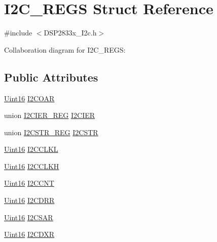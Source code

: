 \hypertarget{struct_i2_c___r_e_g_s}{}\section{I2\+C\+\_\+\+R\+E\+G\+S Struct Reference}
\label{struct_i2_c___r_e_g_s}


{\ttfamily \#include $<$D\+S\+P2833x\+\_\+\+I2c.\+h$>$}



Collaboration diagram for I2\+C\+\_\+\+R\+E\+G\+S\+:
\subsection*{Public Attributes}
\begin{DoxyCompactItemize}
\item 
\hyperlink{_d_s_p2833x___device_8h_a59a9f6be4562c327cbfb4f7e8e18f08b}{Uint16} \hyperlink{struct_i2_c___r_e_g_s_a0c60cb849264d3d8c932511715d55f1d}{I2\+C\+O\+A\+R}
\item 
union \hyperlink{union_i2_c_i_e_r___r_e_g}{I2\+C\+I\+E\+R\+\_\+\+R\+E\+G} \hyperlink{struct_i2_c___r_e_g_s_a476dc6105298595529fe2ac2ce94ba60}{I2\+C\+I\+E\+R}
\item 
union \hyperlink{union_i2_c_s_t_r___r_e_g}{I2\+C\+S\+T\+R\+\_\+\+R\+E\+G} \hyperlink{struct_i2_c___r_e_g_s_a478b82d4d7d8b07ffa5b82cae7f60c1a}{I2\+C\+S\+T\+R}
\item 
\hyperlink{_d_s_p2833x___device_8h_a59a9f6be4562c327cbfb4f7e8e18f08b}{Uint16} \hyperlink{struct_i2_c___r_e_g_s_a8c144771bfe69298b5e7f6dd167263b5}{I2\+C\+C\+L\+K\+L}
\item 
\hyperlink{_d_s_p2833x___device_8h_a59a9f6be4562c327cbfb4f7e8e18f08b}{Uint16} \hyperlink{struct_i2_c___r_e_g_s_ac0196dccce8ca9b880cd05b5d7a45cd3}{I2\+C\+C\+L\+K\+H}
\item 
\hyperlink{_d_s_p2833x___device_8h_a59a9f6be4562c327cbfb4f7e8e18f08b}{Uint16} \hyperlink{struct_i2_c___r_e_g_s_ac472e5f85f435d8542609db043ffaae4}{I2\+C\+C\+N\+T}
\item 
\hyperlink{_d_s_p2833x___device_8h_a59a9f6be4562c327cbfb4f7e8e18f08b}{Uint16} \hyperlink{struct_i2_c___r_e_g_s_a79ef2f770bb58c8608e2aa396e9d0318}{I2\+C\+D\+R\+R}
\item 
\hyperlink{_d_s_p2833x___device_8h_a59a9f6be4562c327cbfb4f7e8e18f08b}{Uint16} \hyperlink{struct_i2_c___r_e_g_s_a4c491e1e0ad10efad5ee6b8cf80f6660}{I2\+C\+S\+A\+R}
\item 
\hyperlink{_d_s_p2833x___device_8h_a59a9f6be4562c327cbfb4f7e8e18f08b}{Uint16} \hyperlink{struct_i2_c___r_e_g_s_a35d80b30895e2ef84c22b31525fc0fde}{I2\+C\+D\+X\+R}

\end{DoxyCompactItemize}
